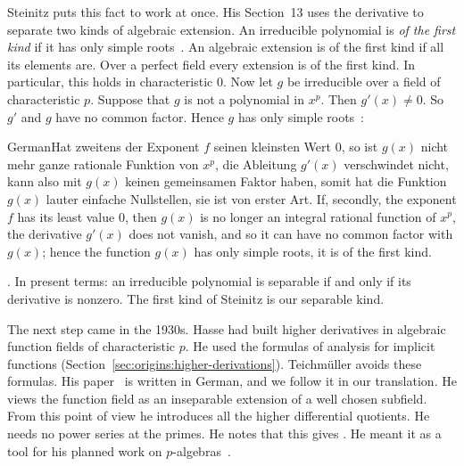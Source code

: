 Steinitz puts this fact to work at once. His Section~13 uses the derivative to separate two kinds of algebraic extension.
An irreducible polynomial is \emph{of the first kind} if it has only simple
roots~\cite[\S 13, p.~231]{Steinitz1910}. An algebraic extension is of the first kind if all its elements are.
Over a perfect field every extension is of the first kind. In particular,
this holds in characteristic $0$. Now let $g$ be irreducible over a field of
characteristic $p$. Suppose that $g$ is not a polynomial in $x^p$. Then
$g'(x) \neq 0$. So $g'$ and $g$ have no common factor. Hence $g$ has only
simple roots~\cite[\S 13, pp.~231--232]{Steinitz1910}:
\begin{originalquote}{German}{Hat zweitens der Exponent $f$ seinen kleinsten Wert $0$, so ist $g(x)$ nicht mehr ganze rationale Funktion von $x^p$, die Ableitung $g'(x)$ verschwindet nicht, kann also mit $g(x)$ keinen gemeinsamen Faktor haben, somit hat die Funktion $g(x)$ lauter einfache Nullstellen, sie ist von erster Art.}
If, secondly, the exponent $f$ has its least value $0$, then $g(x)$ is no
longer an integral rational function of $x^p$, the derivative $g'(x)$ does not
vanish, and so it can have no common factor with $g(x)$; hence the function
$g(x)$ has only simple roots, it is of the first kind.
\end{originalquote}
\noindent\cite[\S 13, p.~232]{Steinitz1910}. In present terms: an
irreducible polynomial is separable if and only if its derivative is nonzero.
The first kind of Steinitz is our separable kind.

The next step came in the 1930s. Hasse had built higher derivatives in algebraic function fields of
characteristic $p$. He used the formulas of analysis for implicit functions
(Section~\ref{sec:origins:higher-derivations}). Teichm\"uller avoids these
formulas. His paper~\cite{Teichmueller1936} is written in German, and we
follow it in our translation. He views the function field as an inseparable
extension of a well chosen subfield. From this point of view he introduces
all the higher differential quotients. He needs no power series at the
primes. He notes that this gives . He meant it
as a tool for his planned work on $p$-algebras~\cite[p.~89]{Teichmueller1936}.

